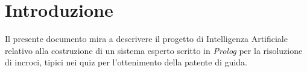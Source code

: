 \chapter{Introduzione}

Il presente documento mira a descrivere il progetto di Intelligenza Artificiale relativo alla costruzione di un sistema esperto scritto in \emph{Prolog} per la risoluzione di incroci, tipici nei quiz per l'ottenimento della patente di guida.


